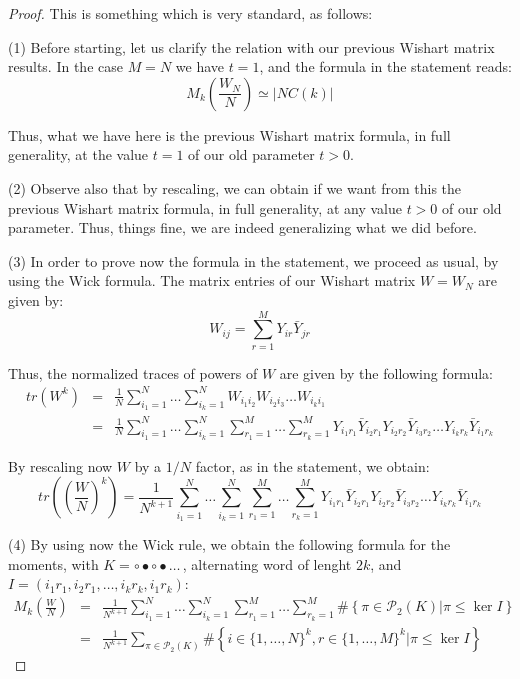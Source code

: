 \documentclass[12pt]{amsbook}
\begin{document}
\begin{proof}
This is something which is very standard, as follows:

\medskip

(1) Before starting, let us clarify the relation with our previous Wishart matrix results. In the case $M=N$ we have $t=1$, and the formula in the statement reads:
$$M_k\left(\frac{W_N}{N}\right)\simeq|NC(k)|$$

Thus, what we have here is the previous Wishart matrix formula, in full generality, at the value $t=1$ of our old parameter $t>0$. 

\medskip

(2) Observe also that by rescaling, we can obtain if we want from this the previous Wishart matrix formula, in full generality, at any value $t>0$ of our old parameter. Thus, things fine, we are indeed generalizing what we did before.

\medskip

(3) In order to prove now the formula in the statement, we proceed as usual, by using the Wick formula. The matrix entries of our Wishart matrix $W=W_N$ are given by:
$$W_{ij}=\sum_{r=1}^MY_{ir}\bar{Y}_{jr}$$

Thus, the normalized traces of powers of $W$ are given by the following formula:
\begin{eqnarray*}
tr(W^k)
&=&\frac{1}{N}\sum_{i_1=1}^N\ldots\sum_{i_k=1}^NW_{i_1i_2}W_{i_2i_3}\ldots W_{i_ki_1}\\
&=&\frac{1}{N}\sum_{i_1=1}^N\ldots\sum_{i_k=1}^N\sum_{r_1=1}^M\ldots\sum_{r_k=1}^MY_{i_1r_1}\bar{Y}_{i_2r_1}Y_{i_2r_2}\bar{Y}_{i_3r_2}\ldots Y_{i_kr_k}\bar{Y}_{i_1r_k}
\end{eqnarray*}

By rescaling now $W$ by a $1/N$ factor, as in the statement, we obtain:
$$tr\left(\left(\frac{W}{N}\right)^k\right)=\frac{1}{N^{k+1}}\sum_{i_1=1}^N\ldots\sum_{i_k=1}^N\sum_{r_1=1}^M\ldots\sum_{r_k=1}^MY_{i_1r_1}\bar{Y}_{i_2r_1}Y_{i_2r_2}\bar{Y}_{i_3r_2}\ldots Y_{i_kr_k}\bar{Y}_{i_1r_k}$$

(4) By using now the Wick rule, we obtain the following formula for the moments, with $K=\circ\bullet\circ\bullet\ldots\,$, alternating word of lenght $2k$, and $I=(i_1r_1,i_2r_1,\ldots,i_kr_k,i_1r_k)$:
\begin{eqnarray*}
M_k\left(\frac{W}{N}\right)
&=&\frac{1}{N^{k+1}}\sum_{i_1=1}^N\ldots\sum_{i_k=1}^N\sum_{r_1=1}^M\ldots\sum_{r_k=1}^M\#\left\{\pi\in\mathcal P_2(K)\Big|\pi\leq\ker I\right\}\\
&=&\frac{1}{N^{k+1}}\sum_{\pi\in\mathcal P_2(K)}\#\left\{i\in\{1,\ldots,N\}^k,r\in\{1,\ldots,M\}^k\Big|\pi\leq\ker I\right\}
\end{eqnarray*}


\end{proof}
\end{document}
